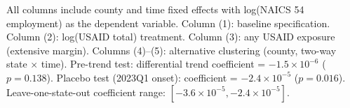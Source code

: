 \begin{table}[htbp]
   \par \raggedright 
   All columns include county and time fixed effects with log(NAICS 54 employment) as the dependent variable. Column (1): baseline specification. Column (2): log(USAID total) treatment. Column (3): any USAID exposure (extensive margin). Columns (4)--(5): alternative clustering (county, two-way state $\times$ time). Pre-trend test: differential trend coefficient = $-1.5 \times 10^{-6}$ ($p = 0.138$). Placebo test (2023Q1 onset): coefficient = $-2.4 \times 10^{-5}$ ($p = 0.016$). Leave-one-state-out coefficient range: $[-3.6 \times 10^{-5}, -2.4 \times 10^{-5}]$.
\end{table}


